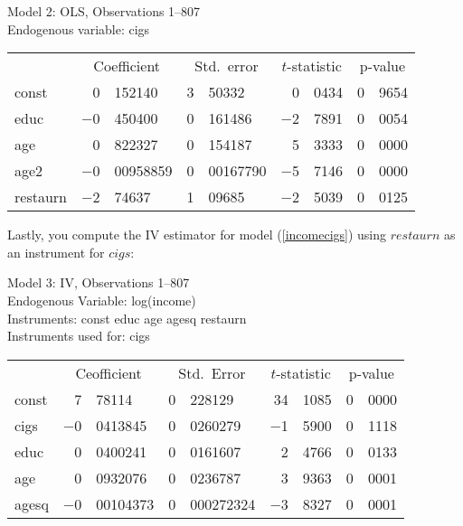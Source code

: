 \documentclass{article}
\begin{document}
\begin{footnotesize}
	\begin{center}		
		Model 2: OLS, Observations 1--807\\
		Endogenous variable: cigs\\
		
		\vspace{1em}
		\renewcommand{\arraystretch}{0.75}
		\begin{tabular}{lr@{,}lr@{,}lr@{,}lr@{,}l}
			&
			\multicolumn{2}{c}{Coefficient} &
			\multicolumn{2}{c}{Std.\ error} &
			\multicolumn{2}{c}{$t$-statistic} &
			\multicolumn{2}{c}{p-value} \\[1ex]
			const &
			0&152140 &
			3&50332 &
			0&0434 &
			0&9654 \\
			educ &
			$-$0&450400 &
			0&161486 &
			$-$2&7891 &
			0&0054 \\
			age &
			0&822327 &
			0&154187 &
			5&3333 &
			0&0000 \\
			age2 &
			$-$0&00958859 &
			0&00167790 &
			$-$5&7146 &
			0&0000 \\
			restaurn &
			$-$2&74637 &
			1&09685 &
			$-$2&5039 &
			0&0125 \\
		\end{tabular}
		
		
	\end{center}
	
\end{footnotesize}
Lastly, you compute the IV estimator for model (\ref{incomecigs}) using $restaurn$ as an instrument for $cigs$:
\begin{footnotesize}
	\begin{center}
		
		Model 3: IV, Observations 1--807\\
		Endogenous Variable: log(income)\\
		Instruments: const educ age agesq restaurn \\
		Instruments used for: cigs \\
		
		\vspace{1em}
		\renewcommand{\arraystretch}{0.75}
		\begin{tabular}{lr@{,}lr@{,}lr@{,}lr@{,}l}
			&
			\multicolumn{2}{c}{Ceofficient} &
			\multicolumn{2}{c}{Std.\ Error} &
			\multicolumn{2}{c}{$t$-statistic} &
			\multicolumn{2}{c}{p-value} \\[1ex]
			const &
			7&78114 &
			0&228129 &
			34&1085 &
			0&0000 \\
			cigs &
			$-$0&0413845 &
			0&0260279 &
			$-$1&5900 &
			0&1118 \\
			educ &
			0&0400241 &
			0&0161607 &
			2&4766 &
			0&0133 \\
			age &
			0&0932076 &
			0&0236787 &
			3&9363 &
			0&0001 \\
			agesq &
			$-$0&00104373 &
			0&000272324 &
			$-$3&8327 &
			0&0001 \\
		\end{tabular}	
				
		\vspace{1em}
		
	\end{center}
\end{footnotesize}
\end{document}
